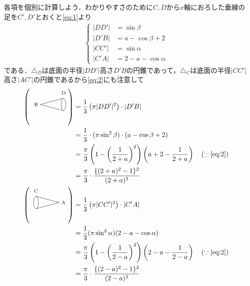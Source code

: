 \documentclass[../../main.tex]{subfiles}
\begin{document}
各項を個別に計算しよう．わかりやすさのために$C,D$から$x$軸におろした垂線の足を$C',D'$とおくと\cref{eq:1}より
\begin{align}
  \begin{cases}
    |DD'| &= \sin\beta \\
    |D'B| &= a-\cos\beta+2 \\
    |CC'| &= \sin\alpha \\
    |C'A| &= 2-a-\cos\alpha
  \end{cases}
\end{align}
である．$\triangle_D$は底面の半径$|DD'|$高さ$D'B$の円錐であって，$\triangle_C$は底面の半径$|CC'|$高さ$|AC'|$の円錐であるから\cref{eq:2}にも注意して
\begin{align}
  \left( \text{
      \begin{tikzpicture}[baseline={(0,0.1)}, scale=0.8, >=stealth]
        \node[anchor=east, font=\scriptsize] at (0,0.4) {B};
        \draw (0,0.4) -- (1.5,0);
        \draw (0,0.4) -- (1.5,0.8);
        \draw (1.5,0.4) ellipse (0.15 and 0.4);
        \node[anchor=south, font=\scriptsize, yshift=2pt] at (1.5,0.8) {D};
  \end{tikzpicture}} \right)
  &=\dfrac{1}{3}\left(\pi|DD'|^2\right)\cdot |D'B| \\
  &=\dfrac{1}{3}\cdot(\pi\sin^2\beta)\cdot(a-\cos\beta+2) \\
  &=\dfrac{\pi}{3}\left(1-\left(\dfrac{1}{2+a}\right)^2\right)\left(a+2-\dfrac{1}{2+a}\right) \quad(\because\text{\cref{eq:2}}) \\
  &=\dfrac{\pi}{3}\cdot\dfrac{\{(2+a)^2-1\}^2}{(2+a)^3} \label{eq:4}\\
  \left( \text{
      \begin{tikzpicture}[baseline={(0,0.1)}, scale=0.8, >=stealth]
        \node[anchor=west, font=\scriptsize] at (1.5,0.4) {A};
        \draw (1.5,0.4) -- (0,0);
        \draw (1.5,0.4) -- (0,0.8);
        \draw (0,0.4) ellipse (0.15 and 0.4);
        \node[anchor=south, font=\scriptsize, yshift=2pt] at (0,0.8) {C};
  \end{tikzpicture}} \right)
  &=\dfrac{1}{3}\left(\pi|CC'|^2\right)\cdot |C'A| \\
  &=\dfrac{1}{3}(\pi\sin^2\alpha)(2-a-\cos\alpha) \\
  &=\dfrac{\pi}{3}\left(1-\left(\dfrac{1}{2-a}\right)^2\right)\left(2-a-\dfrac{1}{2-a}\right) \quad(\because\text{\cref{eq:2}}) \\
  &=\dfrac{\pi}{3}\cdot\dfrac{\{(2-a)^2-1\}^2}{(2-a)^3} \label{eq:5}
\end{align}
\end{document}
